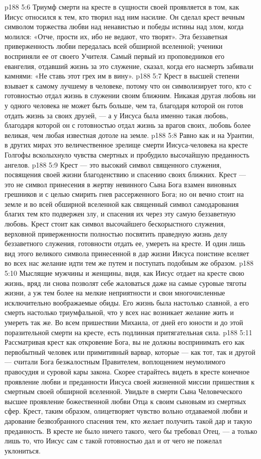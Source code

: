 \vs p188 5:6 Триумф смерти на кресте в сущности своей проявляется в том, как Иисус относился к тем, кто творил над ним насилие. Он сделал крест вечным символом торжества любви над ненавистью и победы истины над злом, когда молился: «Отче, прости их, ибо не ведают, что творят». Эта беззаветная приверженность любви передалась всей обширной вселенной; ученики восприняли ее от своего Учителя. Самый первый из проповедников его евангелия, отдавший жизнь за это служение, сказал, когда его насмерть забивали камнями: «Не ставь этот грех им в вину».
\vs p188 5:7 Крест в высшей степени взывает к самому лучшему в человеке, потому что он символизирует того, кто с готовностью отдал жизнь в служении своим ближним. Никакая другая любовь ни у одного человека не может быть больше, чем та, благодаря которой он готов отдать жизнь за своих друзей, --- а у Иисуса была именно такая любовь, благодаря которой он с готовностью отдал жизнь за врагов своих, любовь более великая, чем любая известная дотоле на земле.
\vs p188 5:8 Равно как и на Урантии, в других мирах это величественное зрелище смерти Иисуса\hyp{}человека на кресте Голгофы всколыхнуло чувства смертных и пробудило высочайшую преданность ангелов.
\vs p188 5:9 \pc Крест --- это высокий символ священного служения, посвящения своей жизни благоденствию и спасению своих ближних. Крест --- это не символ принесения в жертву невинного Сына Бога взамен виновных грешников и с целью смирить гнев рассерженного Бога; но он вечно стоит на земле и во всей обширной вселенной как священный символ самодарования благих тем кто подвержен злу, и спасения их через эту самую беззаветную любовь. Крест стоит как символ высочайшего бескорыстного служения, верховной приверженности полностью посвятить праведную жизнь делу беззаветного служения, готовности отдать ее, умереть на кресте. И один лишь вид этого великого символа принесенной в дар жизни Иисуса поистине вселяет во всех нас желание идти тем же путем и поступать подобным же образом.
\vs p188 5:10 Мыслящие мужчины и женщины, видя, как Иисус отдает на кресте свою жизнь, вряд ли снова позволят себе жаловаться даже на самые суровые тяготы жизни, а уж тем более на мелкие неприятности и свои многочисленные исключительно воображаемые обиды. Его жизнь была настолько славной, а его смерть настолько триумфальной, что у всех нас возникает желание жить и умереть так же. Во всем пришествии Михаила, от дней его юности и до этой поразительной смерти на кресте, есть подлинная притягательная сила.
\vs p188 5:11 Рассматривая крест как откровение Бога, вы не должны воспринимать его как первобытный человек или примитивный варвар, которые --- как тот, так и другой --- считали Бога безжалостным Правителем, воплощением неумолимого правосудия и суровой кары закона. Скорее старайтесь видеть в кресте конечное проявление любви и преданности Иисуса своей жизненной миссии пришествия к смертным своей обширной вселенной. Увидьте в смерти Сына Человеческого высшее проявление божественной любви Отца к своим сыновьям из смертных сфер. Крест, таким образом, олицетворяет чувство вольно отдаваемой любви и дарование безвозбранного спасения тем, кто желает получить такой дар и такую преданность. В кресте не было ничего такого, чего бы требовал Отец, --- а только лишь то, что Иисус сам с такой готовностью дал и от чего не пожелал уклониться.
